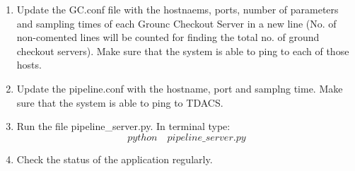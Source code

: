 \begin{enumerate}
	\item Update the GC.conf file with the hostnaems, ports, number of
		parameters and sampling times of each Grounc Checkout Server in a new
		line (No. of non-comented lines will be counted for finding the total
		no. of ground checkout servers). Make sure that the system is able to
		ping to each of those hosts.
	\item Update the pipeline.conf with the hostname, port and samplng time.
		Make sure that the system is able to ping to TDACS.
	\item Run the file pipeline\_server.py. In terminal type:
		$$python \quad pipeline\_server.py$$
	\item Check the status of the application regularly.
\end{enumerate}

